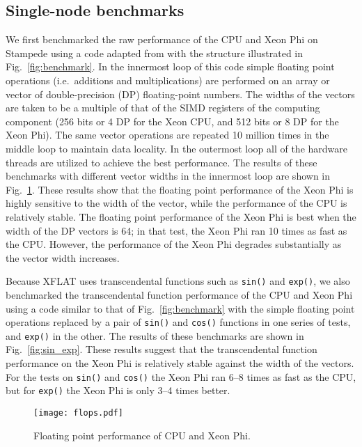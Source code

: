 \documentclass{sig-alternate}
\begin{document}
\subsection{Single-node benchmarks}


We first benchmarked the raw performance of the CPU and
Xeon Phi on  
Stampede using a code adapted from \cite{JeffersReinders201303} with the
structure illustrated in 
Fig.~\ref{fig:benchmark}. In the innermost loop of this
code simple floating point operations (i.e.\ additions and
multiplications) are performed on an array or vector of
double-precision (DP) floating-point 
numbers. The widths of the vectors are taken to be a multiple of that of
the SIMD registers of the computing component (256 bits or 4 DP for
the Xeon CPU, and 512 bits or 8 DP for the Xeon Phi). The same vector operations
are repeated 10 million times in the middle loop to maintain data
locality. In the outermost loop all of the hardware threads are utilized
to achieve the best performance. 
The results of these benchmarks with different vector widths in the
innermost loop are shown in Fig.~\ref{fig:flops}. These results
show that
the floating point performance of the Xeon Phi is highly sensitive to the width
of the vector, while the performance of the CPU is relatively stable. The
floating point performance of the Xeon Phi is best when the width
of the DP vectors is 64; in that test, the Xeon Phi ran 10 times as fast as the
CPU. However, the performance of the Xeon Phi degrades substantially as
the vector width increases. 


Because XFLAT uses transcendental functions such as \texttt{sin()} and
\texttt{exp()}, we also benchmarked the transcendental function
performance of the CPU and Xeon Phi using a code similar to that of 
Fig.~\ref{fig:benchmark} with the simple floating point operations
replaced by a pair of \texttt{sin()} and \texttt{cos()} functions in
one series of tests, 
and \texttt{exp()} in the other. The results of
these benchmarks are shown in Fig.~\ref{fig:sin_exp}. These results
suggest that the transcendental function performance on the Xeon Phi is
relatively stable against the width of the vectors. For the tests on
\texttt{sin()} and \texttt{cos()} the Xeon Phi ran 6--8 times as fast
as the CPU, but for \texttt{exp()} the Xeon Phi is
only 3--4 times better.

\begin{figure}[t]
\centering
\texttt{[image: flops.pdf]}
\caption{Floating point performance of CPU and Xeon Phi.}
\label{fig:flops}
\end{figure}
\end{document}
